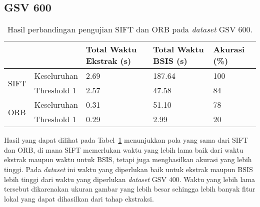 \subsection{GSV 600}
\begin{table}[H]
	\centering
	\begin{tabular}{|l|l|l|l|l|}
		\hline
		&             & \textbf{Total Waktu Ekstrak (s)} & \textbf{Total Waktu BSIS (s)} & \textbf{Akurasi (\%)} \\ \hline
		\multicolumn{1}{|c|}{\multirow{2}{*}{SIFT}} & Keseluruhan & 2.69                             & 187.64                        & 100                   \\ \cline{2-5} 
		\multicolumn{1}{|c|}{}                      & Threshold 1 & 2.57                             & 47.58                         & 84                    \\ \hline
		\multirow{2}{*}{ORB}                        & Keseluruhan & 0.31                             & 51.10                         & 78                    \\ \cline{2-5} 
		& Threshold 1 & 0.29                             & 2.99                          & 20                    \\ \hline
	\end{tabular}
	\caption{Hasil perbandingan pengujian SIFT dan ORB pada \textit{dataset} GSV 600.}
	\label{tab:perbandingan_gsv600}
\end{table}
Hasil yang dapat dilihat pada Tabel~\ref{tab:perbandingan_gsv600} menunjukkan pola yang sama dari SIFT dan ORB, di mana SIFT memerlukan waktu yang lebih lama baik dari waktu ekstrak maupun waktu untuk BSIS, tetapi juga menghasilkan akurasi yang lebih tinggi. Pada \textit{dataset} ini waktu yang diperlukan baik untuk ekstrak maupun BSIS lebih tinggi dari waktu yang diperlukan \textit{dataset} GSV 400. Waktu yang lebih lama tersebut dikarenakan ukuran gambar yang lebih besar sehingga lebih banyak fitur lokal yang dapat dihasilkan dari tahap ekstraksi.


